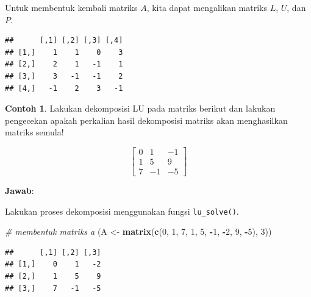 \documentclass[
]{book}
\newenvironment{Shaded}{\begin{snugshade}}{\end{snugshade}}
\newcommand{\CommentTok}[1]{\textcolor[rgb]{0.56,0.35,0.01}{\textit{#1}}}
\newcommand{\DecValTok}[1]{\textcolor[rgb]{0.00,0.00,0.81}{#1}}
\newcommand{\FunctionTok}[1]{\textcolor[rgb]{0.13,0.29,0.53}{\textbf{#1}}}
\newcommand{\NormalTok}[1]{#1}
\newcommand{\OtherTok}[1]{\textcolor[rgb]{0.56,0.35,0.01}{#1}}
\newcommand{\SpecialCharTok}[1]{\textcolor[rgb]{0.81,0.36,0.00}{\textbf{#1}}}
\theoremstyle{definition}
\theoremstyle{definition}
\newtheorem{example}{Contoh}[chapter]
\theoremstyle{definition}
\theoremstyle{definition}
\theoremstyle{remark}
\begin{document}
Untuk membentuk kembali matriks \(A\), kita dapat mengalikan matriks \(L\), \(U\), dan \(P\).

\begin{Shaded}
\end{Shaded}

\begin{verbatim}
##      [,1] [,2] [,3] [,4]
## [1,]    1    1    0    3
## [2,]    2    1   -1    1
## [3,]    3   -1   -1    2
## [4,]   -1    2    3   -1
\end{verbatim}

\begin{example}
\protect\hypertarget{exm:LUexmp2}{}\label{exm:LUexmp2}Lakukan dekomposisi LU pada matriks berikut dan lakukan pengecekan apakah perkalian hasil dekomposisi matriks akan menghasilkan matriks semula!
\end{example}

\[
\begin{bmatrix}
     0         & 1       & -1                  \\[0.3em]
     1         & 5       & 9                   \\[0.3em]
     7         & -1      & -5                  
\end{bmatrix}
\]

\textbf{Jawab}:

Lakukan proses dekomposisi menggunakan fungsi \texttt{lu\_solve()}.

\begin{Shaded}
\begin{Highlighting}[]
\CommentTok{\# membentuk matriks a}
\NormalTok{(A }\OtherTok{\textless{}{-}} \FunctionTok{matrix}\NormalTok{(}\FunctionTok{c}\NormalTok{(}\DecValTok{0}\NormalTok{, }\DecValTok{1}\NormalTok{, }\DecValTok{7}\NormalTok{, }\DecValTok{1}\NormalTok{, }\DecValTok{5}\NormalTok{, }\SpecialCharTok{{-}}\DecValTok{1}\NormalTok{, }\SpecialCharTok{{-}}\DecValTok{2}\NormalTok{, }\DecValTok{9}\NormalTok{, }\SpecialCharTok{{-}}\DecValTok{5}\NormalTok{), }\DecValTok{3}\NormalTok{))}
\end{Highlighting}
\end{Shaded}

\begin{verbatim}
##      [,1] [,2] [,3]
## [1,]    0    1   -2
## [2,]    1    5    9
## [3,]    7   -1   -5
\end{verbatim}
\end{document}

